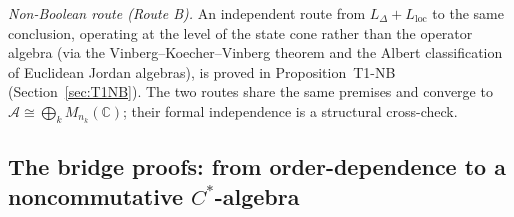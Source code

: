 \documentclass[11pt]{article}
\theoremstyle{remark}
\begin{document}
\smallskip\noindent\textit{Non-Boolean route (Route B).}  An independent route from $L_\Delta + L_{\mathrm{loc}}$ to the same conclusion, operating at the level of the state cone rather than the operator algebra (via the Vinberg--Koecher--Vinberg theorem and the Albert classification of Euclidean Jordan algebras), is proved in Proposition~T1-NB (Section~\ref{sec:T1NB}).  The two routes share the same premises and converge to $\mathcal{A} \cong \bigoplus_k M_{n_k}(\mathbb{C})$; their formal independence is a structural cross-check.
\subsection{The bridge proofs: from order-dependence to a noncommutative $C^*$-algebra}
\label{sec:operator_bridge}


\end{document}
